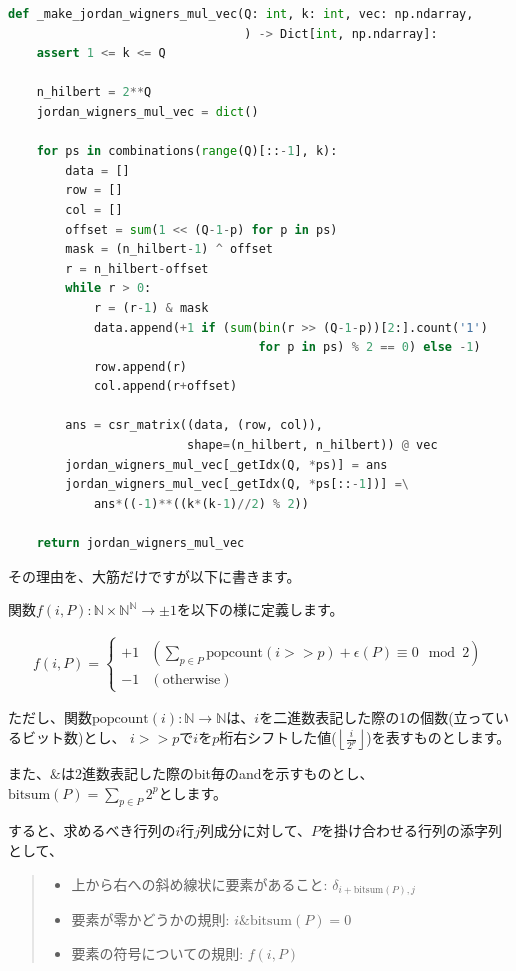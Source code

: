 \documentclass[a4paper, 10pt, dvipdfmx]{jlreq}
\begin{document}
\begin{lstlisting}[caption=Python, label=code:answer, language=Python]
def _make_jordan_wigners_mul_vec(Q: int, k: int, vec: np.ndarray,
                                 ) -> Dict[int, np.ndarray]:
    assert 1 <= k <= Q

    n_hilbert = 2**Q
    jordan_wigners_mul_vec = dict()

    for ps in combinations(range(Q)[::-1], k):
        data = []
        row = []
        col = []
        offset = sum(1 << (Q-1-p) for p in ps)
        mask = (n_hilbert-1) ^ offset
        r = n_hilbert-offset
        while r > 0:
            r = (r-1) & mask
            data.append(+1 if (sum(bin(r >> (Q-1-p))[2:].count('1')
                                   for p in ps) % 2 == 0) else -1)
            row.append(r)
            col.append(r+offset)

        ans = csr_matrix((data, (row, col)),
                         shape=(n_hilbert, n_hilbert)) @ vec
        jordan_wigners_mul_vec[_getIdx(Q, *ps)] = ans
        jordan_wigners_mul_vec[_getIdx(Q, *ps[::-1])] =\
            ans*((-1)**((k*(k-1)//2) % 2))

    return jordan_wigners_mul_vec
\end{lstlisting}

その理由を、大筋だけですが以下に書きます。

関数$f(i,P) : \mathbb{N} \times \mathbb{N}^\mathbb{N} \to \pm 1$を以下の様に定義します。

\begin{align*}
    f(i,P)=
    \begin{cases}
        +1 & (\sum_{p \in P}{\text{popcount}\left(i>>p\right)}+\epsilon(P) \equiv 0 \mod{2}) \\
        -1 & (\text{otherwise})
    \end{cases}
\end{align*}

ただし、関数$\text{popcount}(i): \mathbb{N} \to \mathbb{N}$は、$i$を二進数表記した際の1の個数(立っているビット数)とし、
$i>>p$で$i$を$p$桁右シフトした値($\left\lfloor\frac{i}{2^p}\right\rfloor$)を表すものとします。

また、$\&$は2進数表記した際のbit毎のandを示すものとし、$\text{bitsum}(P)=\sum_{p \in P}{2^p}$とします。

すると、求めるべき行列の$i$行$j$列成分に対して、$P$を掛け合わせる行列の添字列として、

\begin{quote}
    \begin{itemize}
        \item 上から右への斜め線状に要素があること: $\delta_{i+\text{bitsum}(P),j}$
        \item 要素が零かどうかの規則: $i\&\text{bitsum}(P)=0$
        \item 要素の符号についての規則: $f(i,P)$
    \end{itemize}
\end{quote}
\end{document}
